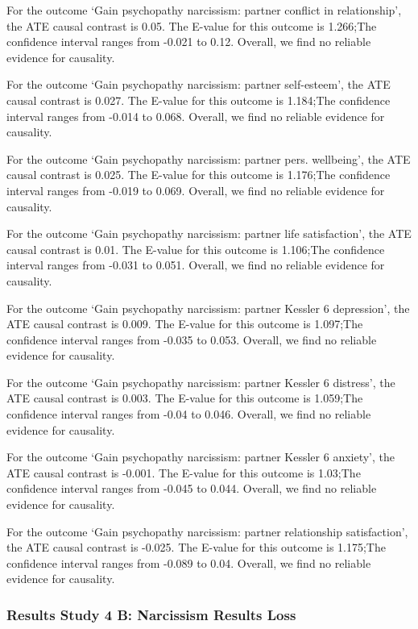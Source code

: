 \documentclass[
  singlecolumn]{article}
\begin{document}
For the outcome `Gain psychopathy narcissism: partner conflict in
relationship', the ATE causal contrast is 0.05. The E-value for this
outcome is 1.266;The confidence interval ranges from -0.021 to 0.12.
Overall, we find no reliable evidence for causality.

For the outcome `Gain psychopathy narcissism: partner self-esteem', the
ATE causal contrast is 0.027. The E-value for this outcome is 1.184;The
confidence interval ranges from -0.014 to 0.068. Overall, we find no
reliable evidence for causality.

For the outcome `Gain psychopathy narcissism: partner pers. wellbeing',
the ATE causal contrast is 0.025. The E-value for this outcome is
1.176;The confidence interval ranges from -0.019 to 0.069. Overall, we
find no reliable evidence for causality.

For the outcome `Gain psychopathy narcissism: partner life
satisfaction', the ATE causal contrast is 0.01. The E-value for this
outcome is 1.106;The confidence interval ranges from -0.031 to 0.051.
Overall, we find no reliable evidence for causality.

For the outcome `Gain psychopathy narcissism: partner Kessler 6
depression', the ATE causal contrast is 0.009. The E-value for this
outcome is 1.097;The confidence interval ranges from -0.035 to 0.053.
Overall, we find no reliable evidence for causality.

For the outcome `Gain psychopathy narcissism: partner Kessler 6
distress', the ATE causal contrast is 0.003. The E-value for this
outcome is 1.059;The confidence interval ranges from -0.04 to 0.046.
Overall, we find no reliable evidence for causality.

For the outcome `Gain psychopathy narcissism: partner Kessler 6
anxiety', the ATE causal contrast is -0.001. The E-value for this
outcome is 1.03;The confidence interval ranges from -0.045 to 0.044.
Overall, we find no reliable evidence for causality.

For the outcome `Gain psychopathy narcissism: partner relationship
satisfaction', the ATE causal contrast is -0.025. The E-value for this
outcome is 1.175;The confidence interval ranges from -0.089 to 0.04.
Overall, we find no reliable evidence for causality.

\subsubsection{Results Study 4 B: Narcissism Results
Loss}\label{results-study-4-b-narcissism-results-loss}
\end{document}
